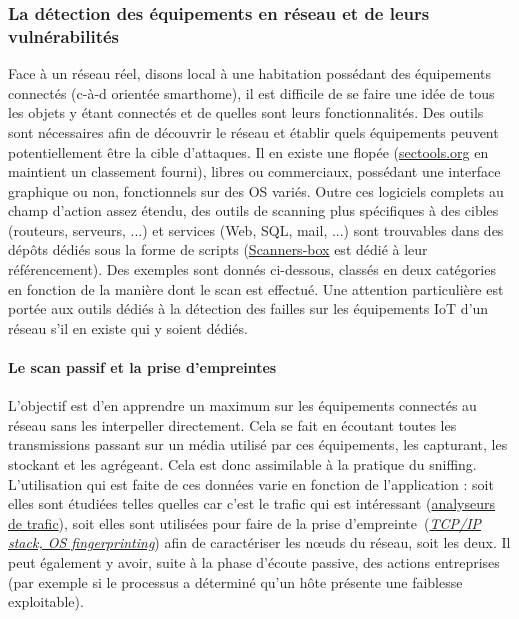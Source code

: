 \documentclass[]{article}
\begin{document}
\subsubsection{La détection des équipements en réseau et de leurs vulnérabilités}

Face à un réseau réel, disons local à une habitation possédant des équipements connectés (c-à-d orientée smarthome), il est difficile de se faire une idée de tous les objets y étant connectés et de quelles sont leurs fonctionnalités. Des outils sont nécessaires afin de découvrir le réseau et établir quels équipements peuvent potentiellement être la cible d'attaques. Il en existe une flopée (\href{https://sectools.org/}{sectools.org} en maintient un classement fourni), libres ou commerciaux, possédant une interface graphique ou non, fonctionnels sur des OS variés. Outre ces logiciels complets au champ d'action assez étendu, des outils de scanning plus spécifiques à des cibles (routeurs, serveurs, ...) et services (Web, SQL, mail, ...) sont trouvables dans des dépôts dédiés sous la forme de scripts (\href{https://github.com/We5ter/Scanners-Box}{Scanners-box} est dédié à leur référencement). Des exemples sont donnés ci-dessous, classés en deux catégories \cite{Leos2014} en fonction de la manière dont le scan est effectué. Une attention particulière est portée aux outils dédiés à la détection des failles sur les équipements IoT d'un réseau s'il en existe qui y soient dédiés.

\paragraph{Le scan passif et la prise d'empreintes}

L'objectif est d'en apprendre un maximum sur les équipements connectés au réseau sans les interpeller directement. Cela se fait en écoutant toutes les transmissions passant sur un média utilisé par ces équipements, les capturant, les stockant et les agrégeant. Cela est donc assimilable à la pratique du sniffing. L'utilisation qui est faite de ces données varie en fonction de l'application : soit elles sont étudiées telles quelles car c'est le trafic qui est intéressant (\href{https://en.wikipedia.org/wiki/Packet_analyzer}{analyseurs de trafic}), soit elles sont utilisées pour faire de la \og prise d'empreinte\fg \ (\href{https://en.wikipedia.org/wiki/TCP/IP_stack_fingerprinting}{\textit{TCP/IP stack, OS fingerprinting}}) afin de caractériser les nœuds du réseau, soit les deux. Il peut également y avoir, suite à la phase d'écoute passive, des actions entreprises (par exemple si le processus a déterminé qu'un hôte présente une faiblesse exploitable).\\
\end{document}
